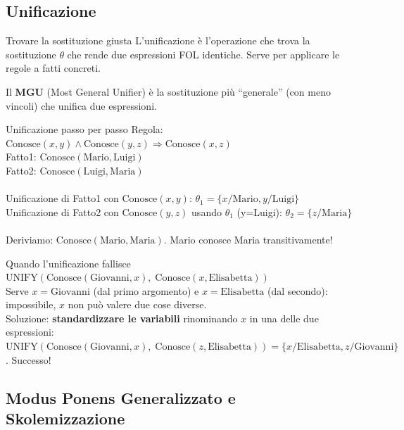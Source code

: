 \documentclass[12pt,a4paper]{article}
\begin{document}
\subsection{Unificazione}

\begin{narrativo}{Trovare la sostituzione giusta}
L'unificazione è l'operazione che trova la sostituzione $\theta$ che rende due espressioni FOL identiche. Serve per applicare le regole a fatti concreti.

Il \textbf{MGU} (Most General Unifier) è la sostituzione più ``generale'' (con meno vincoli) che unifica due espressioni.
\end{narrativo}

\begin{esempio}{Unificazione passo per passo}
Regola: $\text{Conosce}(x, y) \land \text{Conosce}(y, z) \Rightarrow \text{Conosce}(x, z)$\\
Fatto1: $\text{Conosce}(\text{Mario}, \text{Luigi})$\\
Fatto2: $\text{Conosce}(\text{Luigi}, \text{Maria})$\\
\\
Unificazione di Fatto1 con $\text{Conosce}(x,y)$: $\theta_1 = \{x/\text{Mario}, y/\text{Luigi}\}$\\
Unificazione di Fatto2 con $\text{Conosce}(y,z)$ usando $\theta_1$ (y=Luigi): $\theta_2 = \{z/\text{Maria}\}$\\
\\
Deriviamo: $\text{Conosce}(\text{Mario}, \text{Maria})$. Mario conosce Maria transitivamente!
\end{esempio}

\begin{esempio}{Quando l'unificazione fallisce}
$\text{UNIFY}(\text{Conosce}(\text{Giovanni}, x),\; \text{Conosce}(x, \text{Elisabetta}))$\\
Serve $x = \text{Giovanni}$ (dal primo argomento) e $x = \text{Elisabetta}$ (dal secondo): impossibile, $x$ non può valere due cose diverse.\\
Soluzione: \textbf{standardizzare le variabili} rinominando $x$ in una delle due espressioni: $\text{UNIFY}(\text{Conosce}(\text{Giovanni}, x),\; \text{Conosce}(z, \text{Elisabetta})) = \{x/\text{Elisabetta}, z/\text{Giovanni}\}$. Successo!
\end{esempio}

\subsection{Modus Ponens Generalizzato e Skolemizzazione}
\end{document}
